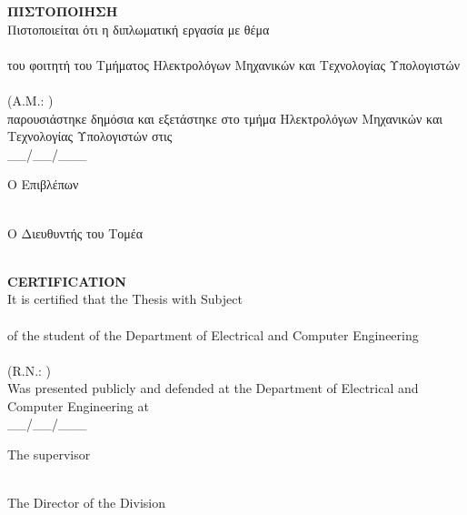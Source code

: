 \pagestyle{empty}
\begin{center}
{\LARGE \textbf{ΠΙΣΤΟΠΟΙΗΣΗ}\\[1cm]}
\large Πιστοποιείται ότι η διπλωματική εργασία με θέμα\\[1cm]
\textbf{\large \thesistitle }\\[1cm]
του φοιτητή του Τμήματος Ηλεκτρολόγων Μηχανικών και Τεχνολογίας Υπολογιστών\\[1.5cm]
\me \\[0.5cm]
(Α.Μ.: \studnum )\\[1.5cm]
παρουσιάστηκε δημόσια και εξετάστηκε στο τμήμα  Ηλεκτρολόγων Μηχανικών και Τεχνολογίας Υπολογιστών στις\\[1cm]
\Large{\_\_/\_\_/\_\_\_}\\[1.5cm]
\end{center}
\begin{minipage}{0.5\textwidth}
\begin{flushleft} \large
Ο Επιβλέπων\\[4cm]
\supname \\
\emph{\suptitle}
\end{flushleft}
\end{minipage}
\begin{minipage}{0.5\textwidth}
\begin{flushright} \large
Ο Διευθυντής του Τομέα\\[4cm]
\headofdivision\\
\emph{\headofdivisiontitle}
\end{flushright}
\end{minipage}

\newpage
\pagestyle{empty}
\begin{center}
{\LARGE \textbf{CERTIFICATION}\\[1cm]}
\large It is certified that the Thesis with Subject\\[1cm]
\textbf{\large \thesistitle }\\[1cm]
of the student of the Department of Electrical and Computer Engineering\\[1.5cm]
\me \\[0.5cm]
(R.N.: \studnum )\\[1.5cm]
Was presented publicly and defended at the Department of Electrical and Computer Engineering at\\[1cm]
\Large{\_\_/\_\_/\_\_\_}\\[1.5cm]
\end{center}
\begin{minipage}{0.5\textwidth}
\begin{flushleft} \large
The supervisor\\[4cm]
\supname \\
\emph{\suptitle}
\end{flushleft}
\end{minipage}
\begin{minipage}{0.5\textwidth}
\begin{flushright} \large
The Director of the Division\\[4cm]
\headofdivision\\
\emph{\headofdivisiontitle}
\end{flushright}
\end{minipage}